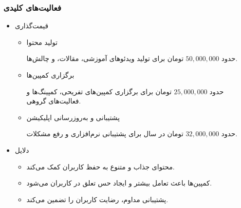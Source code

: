 \documentclass[dvipsnames, svgnames, x11names, 11pt]{article}
\begin{document}
\subsubsection{فعالیت‌های کلیدی}
\begin{itemize}
\item 
قیمت‌گذاری
\begin{itemize}
\item
تولید محتوا

حدود
$50,000,000$
تومان برای تولید ویدئوهای آموزشی، مقالات، و چالش‌ها.

\item
برگزاری کمپین‌ها

حدود
$25,000,000$
تومان برای برگزاری کمپین‌های تفریحی، کمپینگ‌ها و فعالیت‌های گروهی.

\item
پشتیبانی و به‌روزرسانی اپلیکیشن

حدود
$32,000,000$
تومان در سال برای پشتیبانی نرم‌افزاری و رفع مشکلات.
\end{itemize}

\item 
دلایل
\begin{itemize}
\item
محتوای جذاب و متنوع به حفظ کاربران کمک می‌کند.

\item
کمپین‌ها باعث تعامل بیشتر و ایجاد حس تعلق در کاربران می‌شود.

\item
پشتیبانی مداوم، رضایت کاربران را تضمین می‌کند.
\end{itemize}
\end{itemize}
\end{document}
